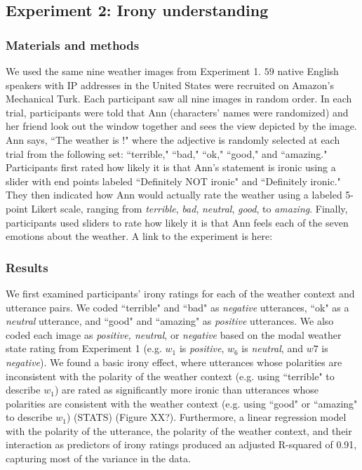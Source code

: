 \documentclass[10pt,letterpaper]{article}
\begin{document}
%

\subsection{Experiment 2: Irony understanding}
\subsubsection{Materials and methods}
We used the same nine weather images from Experiment 1. $59$ native English speakers with IP addresses in the United States were recruited on Amazon's Mechanical Turk. Each participant saw all nine images in random order. In each trial, participants were told that Ann (characters' names were randomized) and her friend look out the window together and sees the view depicted by the image. Ann says, ``The weather is \underline{\hspace{1cm}}!" where the adjective is randomly selected at each trial from the following set: ``terrible," ``bad," ``ok," ``good," and ``amazing." Participants first rated how likely it is that Ann's statement is ironic using a slider with end points labeled ``Definitely NOT ironic" and ``Definitely ironic." They then indicated how Ann would actually rate the weather using a labeled 5-point Likert scale, ranging from \emph{terrible}, \emph{bad}, \emph{neutral}, \emph{good}, to \emph{amazing}. Finally, participants used sliders to rate how likely it is that Ann feels each of the seven emotions about the weather. A link to the experiment is here:

\subsubsection{Results}
We first examined participants' irony ratings for each of the weather context and utterance pairs. We coded ``terrible" and ``bad" as \emph{negative} utterances, ``ok" as a \emph{neutral} utterance, and ``good" and ``amazing" as \emph{positive} utterances. We also coded each image as \emph{positive, neutral}, or \emph{negative} based on the modal weather state rating from Experiment 1 (e.g. $w_1$ is \emph{positive}, $w_6$ is \emph{neutral}, and $w7$ is \emph{negative}). We found a basic irony effect, where utterances whose polarities are inconsistent with the polarity of the weather context (e.g. using ``terrible" to describe $w_1$) are rated as significantly more ironic than utterances whose polarities are consistent with the weather context (e.g. using ``good" or ``amazing" to describe $w_1$) (STATS) (Figure XX?). Furthermore, a linear regression model with the polarity of the utterance, the polarity of the weather context, and their interaction as predictors of irony ratings produced an adjusted R-squared of 0.91, capturing most of the variance in the data. 
\end{document}
